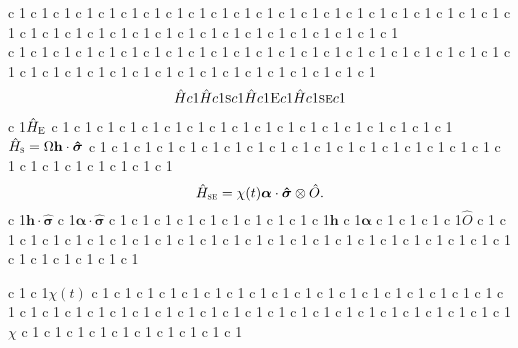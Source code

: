 \documentclass[11pt]{article}
\begin{document}
 c 1  c 1  c 1  c 1  c 1  c 1  c 1  c 1  c 1  c 1  c 1  c 1  c 1  c 1  c 1  c 1  c 1  c 1  c 1  c 1  c 1  c 1  c 1  c 1  c 1  c 1  c 1  c 1  c 1  c 1  c 1  c 1  c 1  c 1  c 1  c 1  c 1  c 1  c 1  c 1 \\  c 1  c 1  c 1  c 1  c 1  c 1  c 1  c 1  c 1  c 1  c 1  c 1  c 1  c 1  c 1  c 1  c 1  c 1  c 1  c 1  c 1  c 1  c 1  c 1  c 1  c 1  c 1  c 1  c 1  c 1  c 1  c 1  c 1  c 1  c 1  c 1  c 1  c 1  c 1
\begin{align}
\hat{H} c 1\hat{H} c 1{\textsc{s}} c 1\hat{H} c 1{\textsc{E}} c 1\hat{H} c 1{\textsc{se}} c 1
\end{align}
 c 1$\hat{H}_{\textsc{E}}$ c 1  c 1  c 1  c 1  c 1  c 1  c 1  c 1  c 1  c 1  c 1  c 1  c 1  c 1  c 1  c 1  c 1  c 1$\hat{H}_{\textsc{s}}=\Omega \mathbf{h}\cdot \bm{\hat{\sigma}}$ c 1  c 1  c 1  c 1  c 1  c 1  c 1  c 1  c 1  c 1  c 1  c 1  c 1  c 1  c 1  c 1  c 1  c 1  c 1  c 1  c 1  c 1  c 1  c 1  c 1  c 1
\begin{equation}
    \hat{H}_{\textsc{se}}= \chi(t) \bm{\alpha}\cdot \bm{\hat{\sigma}} \otimes \hat{{O}}.
\end{equation}
 c 1$\mathbf{h}\cdot \bm{\hat{\sigma}}$ c 1$\bm{\alpha}\cdot \bm{\hat{\sigma}}$ c 1  c 1  c 1  c 1  c 1  c 1  c 1  c 1  c 1  c 1$\mathbf{h}$ c 1$\bm{\alpha}$ c 1  c 1  c 1  c 1$\hat{{O}}$ c 1  c 1  c 1  c 1  c 1  c 1  c 1  c 1  c 1  c 1  c 1  c 1  c 1  c 1  c 1  c 1  c 1  c 1  c 1  c 1  c 1  c 1  c 1  c 1  c 1  c 1  c 1  c 1  c 1  c 1

 c 1  c 1$\chi(t)$ c 1  c 1  c 1  c 1  c 1  c 1  c 1  c 1  c 1  c 1  c 1  c 1  c 1  c 1  c 1  c 1  c 1  c 1  c 1  c 1  c 1  c 1  c 1  c 1  c 1  c 1  c 1  c 1  c 1  c 1  c 1  c 1  c 1  c 1  c 1  c 1  c 1  c 1  c 1  c 1  c 1$\chi$ c 1  c 1  c 1  c 1  c 1  c 1  c 1  c 1  c 1  c 1
\end{document}
